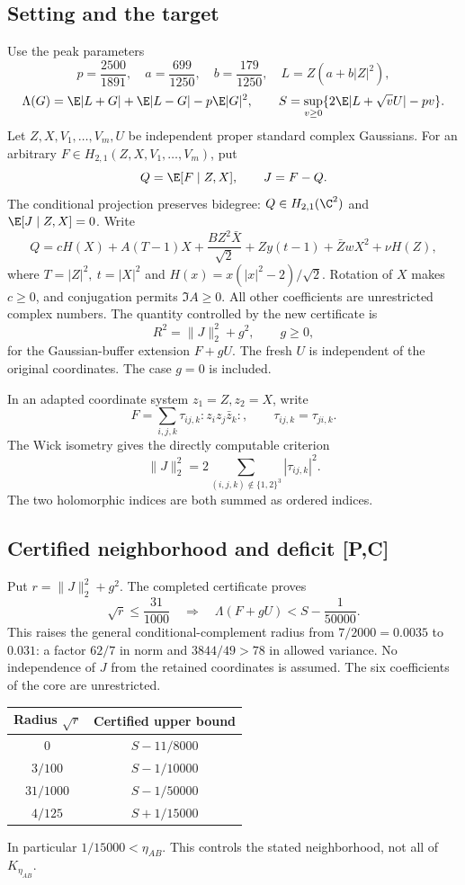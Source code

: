 \subsection{Setting and the target}
Use the peak parameters
\[
 p=\frac{2500}{1891},\quad
 a=\frac{699}{1250},\quad b=\frac{179}{1250},\quad
 L=Z(a+b|Z|^2),
\]
\[
 \Lambda(G)=\E|L+G|+\E|L-G|-p\E|G|^2,\qquad
 S=\sup_{v\ge0}\{2\E|L+\sqrt vU|-pv\}.
\]
Let \(Z,X,V_1,\ldots,V_m,U\) be independent proper standard complex
Gaussians. For an arbitrary
\(F\in H_{2,1}(Z,X,V_1,\ldots,V_m)\), put
\[
 Q=\E[F\mid Z,X],\qquad J=F-Q.
\]
The conditional projection preserves bidegree:
\(Q\in H_{2,1}(\C^2)\) and \(\E[J\mid Z,X]=0\).
Write
\[
 Q=cH(X)+A(T-1)X+\frac{BZ^2\bar X}{\sqrt2}
       +Zy(t-1)+\bar ZwX^2+\nu H(Z),
\]
where \(T=|Z|^2,\ t=|X|^2\) and
\(H(x)=x(|x|^2-2)/\sqrt2\).
Rotation of \(X\) makes \(c\ge0\), and conjugation permits
\(\Im A\ge0\). All other coefficients are unrestricted complex numbers.
The quantity controlled by the new certificate is
\[
 R^2=\|J\|_2^2+g^2,\qquad g\ge0,
\]
for the Gaussian-buffer extension \(F+gU\).
The fresh \(U\) is independent of the original coordinates.
The case \(g=0\) is included.

In an adapted coordinate system \(z_1=Z,z_2=X\), write
\[
 F=\sum_{i,j,k}\tau_{ij,k}:z_i z_j\bar z_k:,\qquad
 \tau_{ij,k}=\tau_{ji,k}.
\]
The Wick isometry gives the directly computable criterion
\[
 \|J\|_2^2=2\sum_{(i,j,k)\notin\{1,2\}^3}|\tau_{ij,k}|^2.
\]
The two holomorphic indices are both summed as ordered indices.

\subsection{Certified neighborhood and deficit [P,C]}
Put \(r=\|J\|_2^2+g^2\). The completed certificate proves
\[
\boxed{\sqrt r\le\frac{31}{1000}
\quad\Longrightarrow\quad
\Lambda(F+gU)<S-\frac1{50000}.}
\tag{54.0}
\]
This raises the general conditional-complement radius from
\(7/2000=0.0035\) to \(0.031\): a factor \(62/7\) in norm and
\(3844/49>78\) in allowed variance.
No independence of \(J\) from the retained coordinates is assumed.
The six coefficients of the core are unrestricted.

\begin{center}
\begin{tabular}{cc}
\toprule
Radius \(\sqrt r\) & Certified upper bound\\
\midrule
\(0\) & \(S-11/8000\)\\
\(3/100\) & \(S-1/10000\)\\
\(31/1000\) & \(S-1/50000\)\\
\(4/125\) & \(S+1/15000\)\\
\bottomrule
\end{tabular}
\end{center}
In particular \(1/15000<\eta_{AB}\).
This controls the stated neighborhood, not all of \(K_{\eta_{AB}}\).

